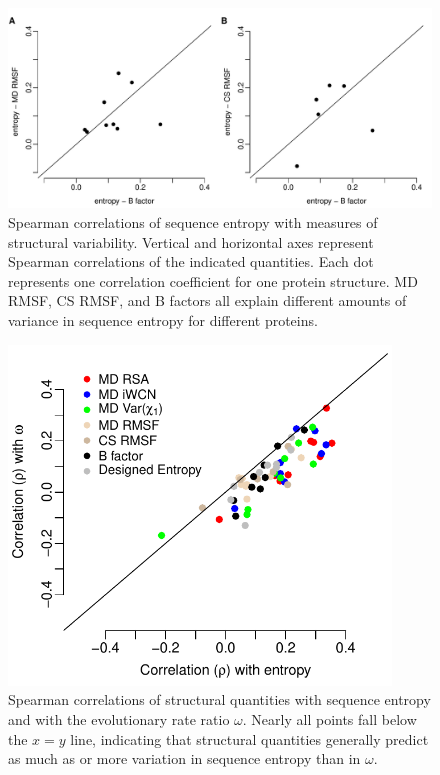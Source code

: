 \documentclass[smallextended]{svjour3}
\begin{document}
\begin{figure}[tbh]
\begin{center}
    \includegraphics[width=6.5in]{cor_entropy_bfca_rmsf.pdf}
\end{center}
\caption{Spearman correlations of sequence entropy with measures of structural variability. Vertical and horizontal axes represent Spearman correlations of the indicated quantities. Each dot represents one correlation coefficient for one protein structure. MD RMSF, CS RMSF, and B factors all explain different amounts of variance in sequence entropy for different proteins.}
\label{fig:cor_entropy_bfca_rmsf}
\end{figure}

\begin{figure}[tbh]
\begin{center}
    \includegraphics[width=4in]{cor_entropy_omega.pdf}
\end{center}
\caption{Spearman correlations of structural quantities with sequence entropy and with the evolutionary rate ratio $\omega$. Nearly all points fall below the $x=y$ line, indicating that structural quantities generally predict as much as or more variation in sequence entropy than in $\omega$.}
\label{fig:cor_entropy_omega}
\end{figure}
\end{document}
